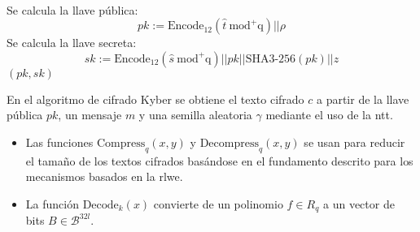 \begin{algorithm}[H]
\begin{algorithmic}[1]
\begin{equation}
\begin{array}{l}
				\end{array} 	
		\end{equation}
		\State Se calcula la llave pública:
		\begin{equation}
			pk:=\text{Encode}_{12}(\hat{t}\ \text{mod}^{+}\text{q} )||\rho 
		\end{equation}
		\Statex {}
		\Statex {}
		\State Se calcula la llave secreta:
		\begin{equation}
			sk:=\text{Encode}_{12}(\hat{s}\ \text{mod}^{+}\text{q} )||pk||\text{SHA3-256}(pk)||z
		\end{equation}
		\Statex {}
		\State \Return $(pk,sk)$
	\end{algorithmic}
\end{algorithm}
\newpage

En el algoritmo de cifrado Kyber se obtiene el texto cifrado \(c\) a partir de la llave pública \(pk\), un mensaje \(m\) y una semilla aleatoria \(\gamma\) mediante el uso de la \gls{ntt}.
\begin{itemize}
	\item Las funciones $\text{Compress}_q(x,y)$ y $\text{Decompress}_q(x,y)$ se usan para reducir el tamaño de los textos cifrados basándose en el fundamento descrito para los mecanismos basados en la \gls{rlwe}. 
	\item La función $\text{Decode}_k(x)$  convierte de un polinomio \(f\in R_q\) a un vector de bits \(B\in\mathcal{B}^{32l}\).
\end{itemize}


